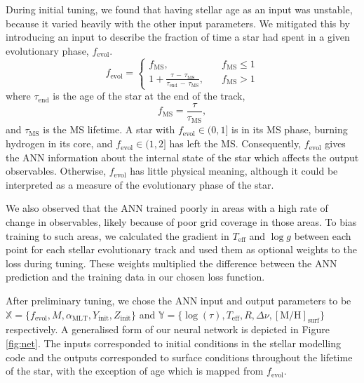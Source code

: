 \documentclass[a4paper,fleqn,usenatbib]{mnras}
\newcommand{\dnu}{\ensuremath{\Delta\nu}}
\newcommand{\metallicity}{\ensuremath{[\mathrm{M}/\mathrm{H}]}}
\newcommand{\teff}{\ensuremath{T_\mathrm{eff}}}
\newcommand{\mlt}{\ensuremath{{\alpha_\mathrm{MLT}}}}
\begin{document}
During initial tuning, we found that having stellar age as an input was unstable, because it varied heavily with the other input parameters. We mitigated this by introducing an input to describe the fraction of time a star had spent in a given evolutionary phase, $f_\mathrm{evol}$. 
%
\begin{equation}
    f_\mathrm{evol} = \begin{cases}
        f_\mathrm{MS},\quad &f_\mathrm{MS} \leq 1\\
        1 + \frac{\tau\,-\,\tau_\mathrm{MS}}{\tau_\mathrm{end}\,-\,\tau_\mathrm{MS}},\quad &f_\mathrm{MS} > 1
    \end{cases}
\end{equation}
%
where $\tau_\mathrm{end}$ is the age of the star at the end of the track,
%
\begin{equation}
    f_\mathrm{MS} = \frac{\tau}{\tau_\mathrm{MS}},
\end{equation}
%
and $\tau_\mathrm{MS}$ is the MS lifetime. A star with $f_\mathrm{evol} \in (0, 1]$ is in its MS phase, burning hydrogen in its core, and $f_\mathrm{evol} \in (1, 2]$ has left the MS. Consequently, $f_\mathrm{evol}$ gives the ANN information about the internal state of the star which affects the output observables. Otherwise, $f_\mathrm{evol}$ has little physical meaning, although it could be interpreted as a measure of the evolutionary phase of the star.

We also observed that the ANN trained poorly in areas with a high rate of change in observables, likely because of poor grid coverage in those areas. To bias training to such areas, we calculated the gradient in $\teff$ and $\log g$ between each point for each stellar evolutionary track and used them as optional weights to the loss during tuning. These weights multiplied the difference between the ANN prediction and the training data in our chosen loss function.

After preliminary tuning, we chose the ANN input and output parameters to be $\boldsymbol{\mathbb{X}} = \{f_\mathrm{evol}, M, \mlt, Y_\mathrm{init}, Z_\mathrm{init}\}$ and $\boldsymbol{\mathbb{Y}} = \{\log(\tau), \teff, R, \dnu, \metallicity_\mathrm{surf}\}$ respectively. A generalised form of our neural network is depicted in Figure \ref{fig:net}. The inputs corresponded to initial conditions in the stellar modelling code and the outputs corresponded to surface conditions throughout the lifetime of the star, with the exception of age which is mapped from $f_\mathrm{evol}$.
\end{document}
